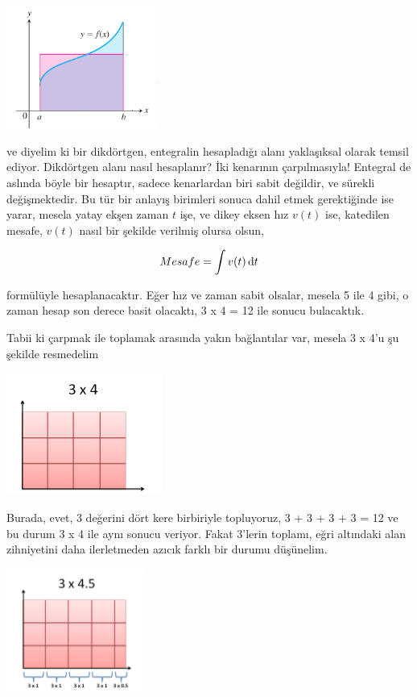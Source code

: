 \documentclass[12pt,fleqn]{article}\usepackage{../../common}
\begin{document}
\includegraphics[height=4cm]{box.png}

ve diyelim ki bir dikdörtgen, entegralin hesapladığı alanı yaklaşıksal
olarak temsil ediyor. Dikdörtgen alanı nasıl hesaplanır? İki kenarının
çarpılmasıyla! Entegral de aslında böyle bir hesaptır, sadece kenarlardan
biri sabit değildir, ve sürekli değişmektedir. Bu tür bir anlayış birimleri
sonuca dahil etmek gerektiğinde ise yarar, mesela yatay ekşen zaman $t$
işe, ve dikey eksen hız $v(t)$ ise, katedilen mesafe, $v(t)$ nasıl bir
şekilde verilmiş olursa olsun,

$$ Mesafe = \int v(t) \,\mathrm{d} t $$

formülüyle hesaplanacaktır. Eğer hız ve zaman sabit olsalar, mesela 5 ile 4
gibi, o zaman hesap son derece basit olacaktı, 3 x 4 = 12 ile sonucu
bulacaktık. 

Tabii ki çarpmak ile toplamak arasında yakın bağlantılar var, mesela 3 x
4'u şu şekilde resmedelim

\includegraphics[height=4cm]{ode_mattuck_94_int_04.png}

Burada, evet, 3 değerini dört kere birbiriyle topluyoruz, 3 + 3 + 3 + 3 =
12 ve bu durum 3 x 4 ile aynı sonucu veriyor. Fakat 3'lerin toplamı, eğri
altındaki alan zihniyetini daha ilerletmeden azıcık farklı bir durumu
düşünelim. 

\includegraphics[height=4cm]{ode_mattuck_94_int_09.png}
\end{document}
